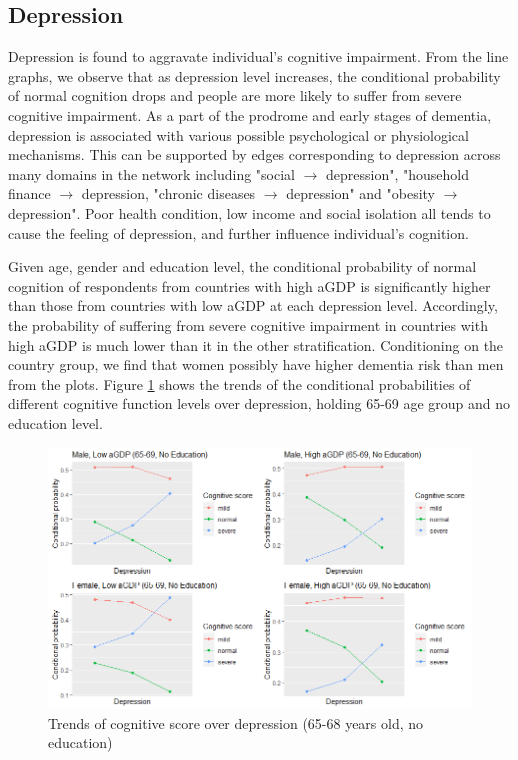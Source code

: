 \documentclass[11pt,twoside]{article}
\numberwithin{Theorem}{section}
\numberwithin{Definition}{section}
\numberwithin{Lemma}{section}
\numberwithin{Algorithm}{section}
\numberwithin{equation}{section}
\begin{document}
\subsection{Depression}

Depression is found to aggravate individual's cognitive impairment. From the line graphs, we observe that as depression level increases, the conditional probability of normal cognition drops and people are more likely to suffer from severe cognitive impairment. As a part of the prodrome and early stages of dementia, depression is associated with various possible psychological or physiological mechanisms. This can be supported by edges corresponding to depression across many domains in the network including "social $\rightarrow$ depression", "household finance $\rightarrow$ depression, "chronic diseases $\rightarrow$ depression" and "obesity $\rightarrow$ depression".  Poor health condition, low income and social isolation all tends to cause the feeling of depression, and further influence individual's cognition.

Given age, gender and education level, the conditional probability of normal cognition of respondents from countries with high aGDP is significantly higher than those from countries with low aGDP at each depression level. Accordingly, the probability of suffering from severe cognitive impairment in countries with high aGDP is much lower than it in the other stratification. Conditioning on the country group, we find that women possibly have higher dementia risk than men from the plots. Figure \ref{fig:depression1} shows the trends of the conditional probabilities of different cognitive function levels over depression, holding 65-69 age group and no education level.

\begin{figure}[!h]
	\centering
	\includegraphics[width = \textwidth]{Images/depression1.png}
	\caption{Trends of cognitive score over depression (65-68 years old, no education)}
	\label{fig:depression1}
\end{figure}
\end{document}
